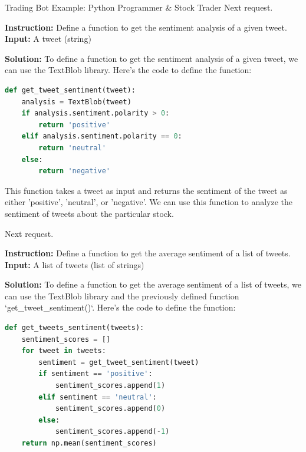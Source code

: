 \begin{AIBoxBreak}{Trading Bot Example: Python Programmer \& Stock Trader}
	Next request.\\

	\usermsg

	\textbf{Instruction:} Define a function to get the sentiment analysis of a given tweet.\\
	\textbf{Input:} A tweet (string)\\

	\assistantmsg

	\textbf{Solution:} To define a function to get the sentiment analysis of a given tweet, we can use the TextBlob library. Here's the code to define the function:

	\begin{lstlisting}[language=Python]
def get_tweet_sentiment(tweet):
    analysis = TextBlob(tweet)
    if analysis.sentiment.polarity > 0:
        return 'positive'
    elif analysis.sentiment.polarity == 0:
        return 'neutral'
    else:
        return 'negative'
\end{lstlisting}




	This function takes a tweet as input and returns the sentiment of the tweet as either 'positive', 'neutral', or 'negative'. We can use this function to analyze the sentiment of tweets about the particular stock.

	Next request.\\

	\usermsg

	\textbf{Instruction:} Define a function to get the average sentiment of a list of tweets.\\
	\textbf{Input:} A list of tweets (list of strings)\\

	\assistantmsg

	\textbf{Solution:} To define a function to get the average sentiment of a list of tweets, we can use the TextBlob library and the previously defined function `get\_tweet\_sentiment()`. Here's the code to define the function:

	\begin{lstlisting}[language=Python]
def get_tweets_sentiment(tweets):
    sentiment_scores = []
    for tweet in tweets:
        sentiment = get_tweet_sentiment(tweet)
        if sentiment == 'positive':
            sentiment_scores.append(1)
        elif sentiment == 'neutral':
            sentiment_scores.append(0)
        else:
            sentiment_scores.append(-1)
    return np.mean(sentiment_scores)
\end{lstlisting}



\end{AIBoxBreak}

